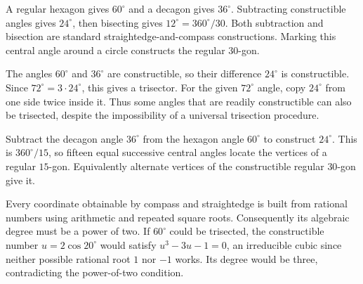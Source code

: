 A regular hexagon gives $60^\circ$ and a decagon gives $36^\circ$. Subtracting constructible angles gives $24^\circ$, then bisecting gives $12^\circ=360^\circ/30$. Both subtraction and bisection are standard straightedge-and-compass constructions. Marking this central angle around a circle constructs the regular $30$-gon.

The angles $60^\circ$ and $36^\circ$ are constructible, so their difference $24^\circ$ is constructible. Since $72^\circ=3\cdot24^\circ$, this gives a trisector. For the given $72^\circ$ angle, copy $24^\circ$ from one side twice inside it. Thus some angles that are readily constructible can also be trisected, despite the impossibility of a universal trisection procedure.

Subtract the decagon angle $36^\circ$ from the hexagon angle $60^\circ$ to construct $24^\circ$. This is $360^\circ/15$, so fifteen equal successive central angles locate the vertices of a regular $15$-gon. Equivalently alternate vertices of the constructible regular $30$-gon give it.

Every coordinate obtainable by compass and straightedge is built from rational numbers using arithmetic and repeated square roots. Consequently its algebraic degree must be a power of two. If $60^\circ$ could be trisected, the constructible number $u=2\cos20^\circ$ would satisfy $u^3-3u-1=0$, an irreducible cubic since neither possible rational root $1$ nor $-1$ works. Its degree would be three, contradicting the power-of-two condition.
